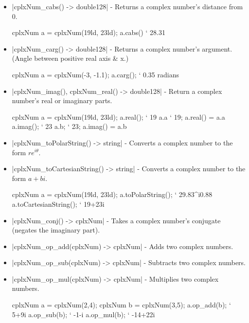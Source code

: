 \documentclass[12pt, letterpaper, oneside]{article}
\begin{document}
	\begin{itemize}
		\item[--] \spverb|cplxNum_cabs() -> double128| - Returns a complex number's distance from 0.
		\begin{spverbatim}
			cplxNum a = cplxNum(19ld, 23ld);
			a.cabs() ` 28.31
		\end{spverbatim}
		\item[--] \spverb|cplxNum_carg() -> double128| - Returns a complex number's argument. (Angle between positive real axis \& x.)
		\begin{spverbatim}
			cplxNum a = cplxNum(-3, -1.1);
			a.carg(); ` 0.35 radians
		\end{spverbatim}
		\item[--] \spverb|cplxNum_imag(), cplxNum_real() -> double128| - Return a complex number's real or imaginary parts.
		\newline
		\begin{spverbatim}
			cplxNum a = cplxNum(19ld, 23ld);
			a.real(); ` 19
			a.a ` 19; a.real() = a.a
			a.imag(); ` 23
			a.b; ` 23; a.imag() = a.b
		\end{spverbatim}
		\newline
		\item[--] \spverb|cplxNum_toPolarString() -> string| - Converts a complex number to the form $re^{i\theta}$.
		\item[--] \spverb|cplxNum_toCartesianString() -> string| - Converts a complex number to the form $a+bi$.
		\newline
		\begin{spverbatim}
			cplxNum a = cplxNum(19ld, 23ld);
			a.toPolarString(); ` 29.83^i0.88
			a.toCartesianString(); ` 19+23i
		\end{spverbatim}
		\item[--] \spverb|cplxNum_conj() -> cplxNum| - Takes a complex number's conjugate (negates the imaginary part).
		\item[--] \spverb|cplxNum_op_add(cplxNum) -> cplxNum| - Adds two complex numbers.
		\item[--] \spverb|cplxNum_op_sub(cplxNum) -> cplxNum| - Subtracts two complex numbers.
		\item[--] \spverb|cplxNum_op_mul(cplxNum) -> cplxNum| - Multiplies two complex numbers.
		\newline
		\begin{spverbatim}
			cplxNum a = cplxNum(2,4);
			cplxNum b = cplxNum(3,5);
			a.op_add(b); ` 5+9i
			a.op_sub(b); ` -1-i
			a.op_mul(b); ` -14+22i
		\end{spverbatim}
	\end{itemize}
\end{document}
